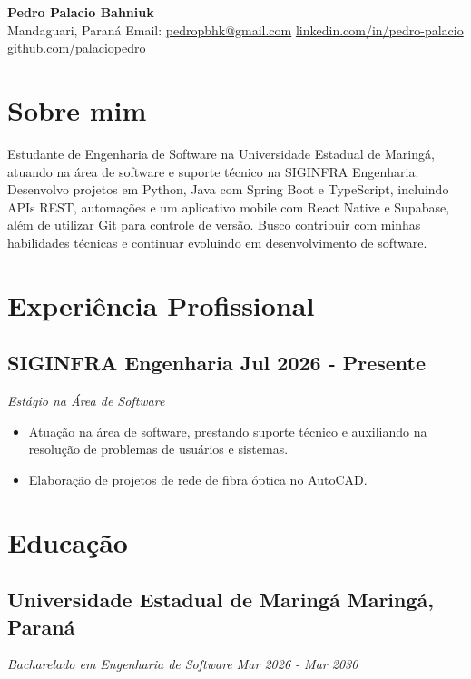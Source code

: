 \documentclass[a4paper,10pt]{article}
\begin{document}
\begin{center}
    {\LARGE \textbf{Pedro Palacio Bahniuk}} 
    \\ [0.1cm]
    Mandaguari, Paraná
    {\textbullet}
    Email: \href{mailto:pedropbhk@gmail.com}{pedropbhk@gmail.com} 
    {\textbullet}
    \href{https://www.linkedin.com/in/pedro-palacio}{linkedin.com/in/pedro-palacio} 
    {\textbullet}
    \href{https://github.com/palaciopedro}{github.com/palaciopedro}
\end{center}


\section{Sobre mim}
    Estudante de Engenharia de Software na Universidade Estadual de Maringá, atuando na área de software e suporte técnico na SIGINFRA Engenharia. Desenvolvo projetos em Python, Java com Spring Boot e TypeScript, incluindo APIs REST, automações e um aplicativo mobile com React Native e Supabase, além de utilizar Git para controle de versão. Busco contribuir com minhas habilidades técnicas e continuar evoluindo em desenvolvimento de software.

\section{Experiência Profissional}
    \subsection*{\texorpdfstring{
            \textbf{SIGINFRA Engenharia} \hfill Jul 2026 - Presente
        }{
            SIGINFRA Engenharia -- Jul 2026 - Presente
        }}
    \textit{Estágio na Área de Software}
    \begin{itemize}
        \item Atuação na área de software, prestando suporte técnico e auxiliando na resolução de problemas de usuários e sistemas.
        \item Elaboração de projetos de rede de fibra óptica no AutoCAD.
    \end{itemize}

\section{Educação}
    \subsection*{\texorpdfstring{
            \textbf{Universidade Estadual de Maringá} \hfill Maringá, Paraná
        }{
            Universidade Estadual de Maringá -- Maringá, Paraná
        }}
    \textit{Bacharelado em Engenharia de Software \hfill Mar 2026 - Mar 2030 }
\end{document}
